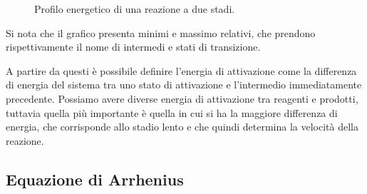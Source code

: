 \begin{figure}[htbp]
    \centering
    \caption{Profilo energetico di una reazione a due stadi.}
    \label{fig:profilo_energia}
\end{figure}

Si nota che il grafico presenta minimi e massimo relativi, che prendono rispettivamente il nome di intermedi e stati di transizione. 

A partire da questi è possibile definire l'energia di attivazione come la differenza di energia del sistema tra uno stato di attivazione e l'intermedio immediatamente precedente. 
Possiamo avere diverse energia di attivazione tra reagenti e prodotti, tuttavia quella più importante è quella in cui si ha la maggiore differenza di energia, che corrisponde allo stadio lento e che quindi determina la velocità della reazione. 

\subsection{Equazione di Arrhenius}

